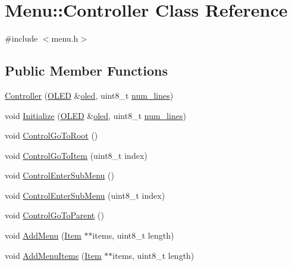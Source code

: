 \hypertarget{class_menu_1_1_controller}{}\section{Menu\+:\+:Controller Class Reference}
\label{class_menu_1_1_controller}


{\ttfamily \#include $<$menu.\+h$>$}

\subsection*{Public Member Functions}
\begin{DoxyCompactItemize}
\item 
\hyperlink{class_menu_1_1_controller_afcbda47e43a9753875631f0d4106f604}{Controller} (\hyperlink{class_o_l_e_d}{O\+L\+ED} \&\hyperlink{class_menu_1_1_controller_aaa0388123d9e3bb0d4f546336e2b502d}{oled}, uint8\+\_\+t \hyperlink{class_menu_1_1_controller_a80d614a66d1ffa2612688776842f1f31}{num\+\_\+lines})
\item 
void \hyperlink{class_menu_1_1_controller_a9cf59f4581c2f1943bde424060476c40}{Initialize} (\hyperlink{class_o_l_e_d}{O\+L\+ED} \&\hyperlink{class_menu_1_1_controller_aaa0388123d9e3bb0d4f546336e2b502d}{oled}, uint8\+\_\+t \hyperlink{class_menu_1_1_controller_a80d614a66d1ffa2612688776842f1f31}{num\+\_\+lines})
\item 
void \hyperlink{class_menu_1_1_controller_a4d270009fff9dfc6baa4433f219626c4}{Control\+Go\+To\+Root} ()
\item 
void \hyperlink{class_menu_1_1_controller_a0dae623388e9bb9e651385d0ef9a2394}{Control\+Go\+To\+Item} (uint8\+\_\+t index)
\item 
void \hyperlink{class_menu_1_1_controller_a9a4c0ccd822f485834ec9abb4133a059}{Control\+Enter\+Sub\+Menu} ()
\item 
void \hyperlink{class_menu_1_1_controller_a8bc1d62574e86a08d5a60652370dd21a}{Control\+Enter\+Sub\+Menu} (uint8\+\_\+t index)
\item 
void \hyperlink{class_menu_1_1_controller_ad4bcb0925c933dce2cceacdbd1b26294}{Control\+Go\+To\+Parent} ()
\item 
void \hyperlink{class_menu_1_1_controller_ab530ec11f04b96254b93961d26152d3c}{Add\+Menu} (\hyperlink{struct_menu_1_1_item}{Item} $\ast$$\ast$items, uint8\+\_\+t length)
\item 
void \hyperlink{class_menu_1_1_controller_ad28e732923bf111fd26a7ea031885f70}{Add\+Menu\+Items} (\hyperlink{struct_menu_1_1_item}{Item} $\ast$$\ast$items, uint8\+\_\+t length)

\end{DoxyCompactItemize}
